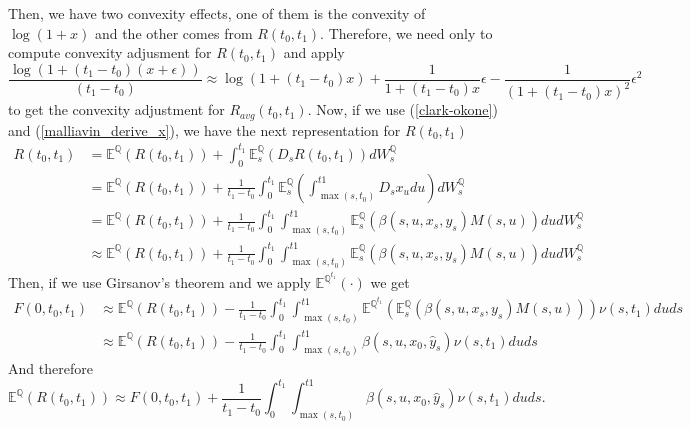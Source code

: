 \documentclass[a4paper,10pt]{article}
\newcommand{\1}{\mathbf{1}}
\begin{document}
Then, we have two convexity effects, one of them is the convexity of $\log(1+x)$ and the other comes from $R(t_0,t_1)$. Therefore, we need only to compute convexity adjusment for $R(t_0,t_1)$ and apply 
\begin{equation}\label{log_approximation}
\frac{\log(1 + (t_1 - t_0)(x +\epsilon))}{(t_1 - t_0)} \approx \log(1 + (t_1 - t_0)x) + \frac{1}{1 + (t_1 - t_0)x}   \epsilon - \frac{1}{(1 + (t_1 - t_0)x)^{2}} \epsilon^{2}
\end{equation}
to get the convexity adjustment for $R_{avg}(t_0,t_1)$. Now, if we use (\ref{clark-okone}) and (\ref{malliavin_derive_x}), we have the next representation for $R(t_0,t_1)$ 
\begin{align*}
R(t_0,t_1) &=   \mathbb{E}^{\mathbb{Q}}\left(R(t_0,t_1) \right) + \int_{0}^{t_1}\mathbb{E}^{\mathbb{Q}}_s\left(D_s R(t_0,t_1) \right) dW^{\mathbb{Q}}_s \\
&= \mathbb{E}^{\mathbb{Q}}\left(R(t_0,t_1) \right) + \frac{1}{t_1- t_0} \int_{0}^{t_1}\mathbb{E}^{\mathbb{Q}}_s\left(\int_{\max(s,t_0)}^{t1} D_s x_u du \right) dW^{\mathbb{Q}}_s \\
&= \mathbb{E}^{\mathbb{Q}}\left(R(t_0,t_1) \right) + \frac{1}{t_1- t_0}  \int_{0}^{t_1}\int_{\max(s,t_0)}^{t1} \mathbb{E}^{\mathbb{Q}}_s\left(\beta(s,u, x_s, y_s)M(s,u)  \right) du  dW^{\mathbb{Q}}_s\\
&\approx \mathbb{E}^{\mathbb{Q}}\left(R(t_0,t_1) \right) +  \frac{1}{t_1- t_0}  \int_{0}^{t_1}\int_{\max(s,t_0)}^{t1} \mathbb{E}^{\mathbb{Q}}_s\left(\beta(s,u, x_s, y_s)M(s,u)  \right) du  dW^{\mathbb{Q}}_s
\end{align*}
Then, if we use Girsanov's theorem and we apply $\mathbb{E}^{\mathbb{Q}^{t_1}}(\cdot)$ we get
\begin{align*}
F(0,t_0,t_1) &\approx \mathbb{E}^{\mathbb{Q}}\left(R(t_0,t_1) \right) - \frac{1}{t_1- t_0}   \int_{0}^{t_1}\int_{\max(s,t_0)}^{t1}  \mathbb{E}^{\mathbb{Q}^{t_1}}\left(\mathbb{E}^{\mathbb{Q}}_s\left(\beta(s,u, x_s, y_s)M(s,u)  \right)  \right) \nu(s,t_1)  du ds \\
&\approx  \mathbb{E}^{\mathbb{Q}}\left(R(t_0,t_1) \right) -  \frac{1}{t_1- t_0}  \int_{0}^{t_1}\int_{\max(s,t_0)}^{t1}  \beta(s,u, x_0, \hat{y}_s) \nu(s,t_1)  du ds  
\end{align*}
And therefore
\begin{equation}\label{convexity_ois_future}
 \mathbb{E}^{\mathbb{Q}}\left(R(t_0,t_1) \right) \approx F(0,t_0,t_1) + \frac{1}{t_1- t_0}   \int_{0}^{t_1}\int_{\max(s,t_0)}^{t1}  \beta(s,u, x_0, \hat{y}_s)  \nu(s,t_1)  du ds.
\end{equation}
\end{document}
